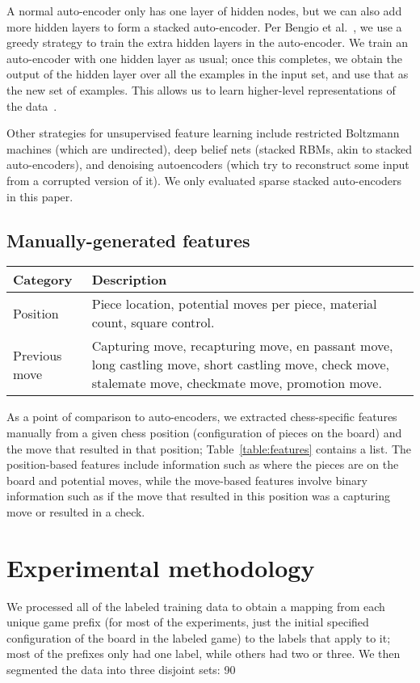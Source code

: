 \documentclass[11pt]{article}
\begin{document}
A normal auto-encoder only has one layer of hidden nodes, but we can also add more hidden layers to form a stacked auto-encoder. Per Bengio et al.~, we use a greedy strategy to train the extra hidden layers in the auto-encoder. We train an auto-encoder with one hidden layer as usual; once this completes, we obtain the output of the hidden layer over all the examples in the input set, and use that as the new set of examples. This allows us to learn higher-level representations of the data~\cite{Vincent}.

Other strategies for unsupervised feature learning include restricted Boltzmann machines (which are undirected), deep belief nets (stacked RBMs, akin to stacked auto-encoders), and denoising autoencoders (which try to reconstruct some input from a corrupted version of it). We only evaluated sparse stacked auto-encoders in this paper.

\subsection{Manually-generated features}
\begin{table*}
\centering
\begin{tabular}{lp{}}
\hline
\textbf{Category} & \textbf{Description} \\ \hline
Position & Piece location, potential moves per piece, material count, square control. \\
Previous move & Capturing move, recapturing move, en passant move, long castling move, short castling move, check move, stalemate move, checkmate move, promotion move. \\
\hline
\end{tabular} 
\caption{List of chess-specific manual features per position.}
\label{table:features}
\end{table*}

As a point of comparison to auto-encoders, we extracted chess-specific features manually from a given chess position (configuration of pieces on the board) and the move that resulted in that position; Table~\ref{table:features} contains a list. The position-based features include information such as where the pieces are on the board and potential moves, while the move-based features involve binary information such as if the move that resulted in this position was a capturing move or resulted in a check.

\section{Experimental methodology}
We processed all of the labeled training data to obtain a mapping from each unique game prefix (for most of the experiments, just the initial specified configuration of the board in the labeled game) to the labels that apply to it; most of the prefixes only had one label, while others had two or three. We then segmented the data into three disjoint sets: 90%
\end{document}
